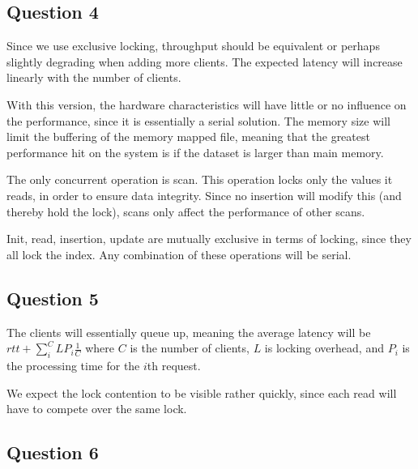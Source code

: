 \documentclass[11pt,a4paper]{article}
\begin{document}
\subsection{Question 4}
Since we use exclusive locking, throughput should be equivalent or perhaps slightly degrading
when adding more clients. The expected latency will increase linearly with the number of
clients.

With this version, the hardware characteristics will have little or no influence on the
performance, since it is essentially a serial solution. The memory size will limit the
buffering of the memory mapped file, meaning that the greatest performance hit
on the system is if the dataset is larger than main memory.

The only concurrent operation is scan. This operation locks only the values it
reads, in order to ensure data integrity. Since no insertion will modify this
(and thereby hold the lock), scans only affect the performance of other scans.

Init, read, insertion, update are mutually exclusive in terms of locking, since
they all lock the index. Any combination of these operations will be serial.

\subsection{Question 5}

The clients will essentially queue up, meaning the average latency will be
$rtt + \sum_i^C L P_i \frac 1 C$ where $C$ is the number of clients, $L$ is
locking overhead, and $P_i$ is the processing time for the $i$th request.

We expect the lock contention to be visible rather quickly, since each read will
have to compete over the same lock.

\subsection{Question 6}
\end{document}
